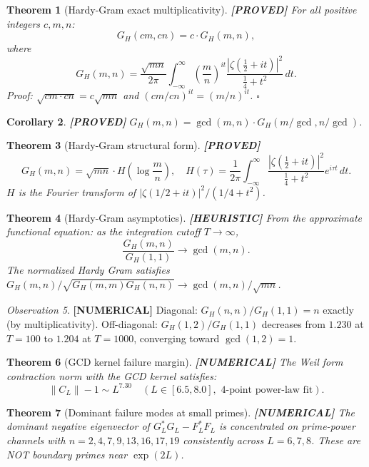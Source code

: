 \documentclass[11pt]{article}
\newtheorem{theorem}{Theorem}[section]
\newtheorem{corollary}[theorem]{Corollary}
\theoremstyle{remark}
\newtheorem{observation}[theorem]{Observation}
\newcommand{\PROVED}{\textbf{\color{blue}[PROVED]}}
\newcommand{\NUMERICAL}{\textbf{\color{orange}[NUMERICAL]}}
\newcommand{\HEURISTIC}{\textbf{\color{orange!80!black}[HEURISTIC]}}
\begin{document}
\begin{theorem}[Hardy-Gram exact multiplicativity] \PROVED{}
For all positive integers $c, m, n$:
\[
G_H(cm, cn) = c \cdot G_H(m, n),
\]
where
\[
G_H(m,n) = \frac{\sqrt{mn}}{2\pi} \int_{-\infty}^\infty \left(\frac{m}{n}\right)^{it}
\frac{|\zeta(\tfrac{1}{2}+it)|^2}{\tfrac{1}{4}+t^2}\,dt.
\]
Proof: $\sqrt{cm \cdot cn} = c\sqrt{mn}$ and $(cm/cn)^{it} = (m/n)^{it}$. $\square$
\end{theorem}

\begin{corollary} \PROVED{}
$G_H(m,n) = \gcd(m,n) \cdot G_H(m/\gcd, n/\gcd)$.
\end{corollary}

\begin{theorem}[Hardy-Gram structural form] \PROVED{}
\[
G_H(m,n) = \sqrt{mn} \cdot H\!\left(\log\frac{m}{n}\right), \quad
H(\tau) = \frac{1}{2\pi}\int_{-\infty}^\infty \frac{|\zeta(\tfrac{1}{2}+it)|^2}{\tfrac{1}{4}+t^2} e^{i\tau t}\,dt.
\]
$H$ is the Fourier transform of $|\zeta(1/2+it)|^2/(1/4+t^2)$.
\end{theorem}

\begin{theorem}[Hardy-Gram asymptotics] \HEURISTIC{}
From the approximate functional equation: as the integration cutoff $T \to \infty$,
\[
\frac{G_H(m,n)}{G_H(1,1)} \to \gcd(m,n).
\]
The normalized Hardy Gram satisfies $G_H(m,n)/\sqrt{G_H(m,m) G_H(n,n)} \to \gcd(m,n)/\sqrt{mn}$.
\end{theorem}

\begin{observation} \NUMERICAL{}
Diagonal: $G_H(n,n)/G_H(1,1) = n$ exactly (by multiplicativity).
Off-diagonal: $G_H(1,2)/G_H(1,1)$ decreases from $1.230$ at $T=100$ to $1.204$ at $T=1000$,
converging toward $\gcd(1,2) = 1$.
\end{observation}

\begin{theorem}[GCD kernel failure margin] \NUMERICAL{}
The Weil form contraction norm with the GCD kernel satisfies:
\[
\|C_L\| - 1 \sim L^{7.30} \quad (L \in [6.5, 8.0], \text{ 4-point power-law fit}).
\]
\end{theorem}

\begin{theorem}[Dominant failure modes at small primes] \NUMERICAL{}
The dominant negative eigenvector of $G_L^* G_L - F_L^* F_L$ is concentrated on
prime-power channels with $n = 2, 4, 7, 9, 13, 16, 17, 19$
consistently across $L = 6, 7, 8$. These are NOT boundary primes near $\exp(2L)$.
\end{theorem}
\end{document}
